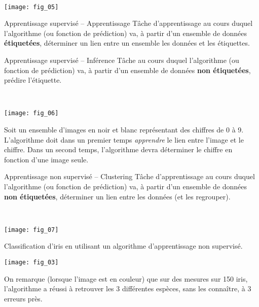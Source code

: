 \begin{exemple}~\\

\begin{center}
\texttt{[image: fig\_05]}
\end{center}
\end{exemple}


\begin{defi}{Apprentissage supervisé -- Apprentissage}
Tâche d'apprentissage au cours duquel l'algorithme (ou fonction de prédiction) va, à partir d'un ensemble de données \textbf{étiquetées}, déterminer un lien entre un ensemble les données et les étiquettes. 
\end{defi}

\begin{defi}{Apprentissage supervisé -- Inférence}
Tâche au cours duquel l'algorithme (ou fonction de prédiction) va, à partir d'un ensemble de données \textbf{non étiquetées}, prédire l'étiquette.

\end{defi}



\begin{exemple}~\\

\begin{center}
\texttt{[image: fig\_06]}
\end{center}
\end{exemple}


\begin{exemple}
Soit un ensemble d'images en noir et blanc représentant des chiffres de 0 à 9. L'algorithme doit dans un premier temps \textit{apprendre} le lien entre l'image et le chiffre. 
Dans un second temps, l'algorithme devra déterminer le chiffre en fonction d'une image seule.
\end{exemple}

\begin{defi}{Apprentissage non supervisé -- Clustering}
Tâche d'apprentissage au cours duquel l'algorithme (ou fonction de prédiction) va, à partir d'un ensemble de données \textbf{non étiquetées}, déterminer un lien entre les données (et les regrouper). 
\end{defi}



\begin{exemple} ~\\


\begin{center}
\texttt{[image: fig\_07]}
\end{center}


Classification d'iris en utilisant un algorithme d'apprentissage non supervisé.
\begin{center}
\texttt{[image: fig\_03]}
\end{center}

On remarque (lorsque l'image est en couleur) que sur des mesures sur 150 iris, l'algorithme a réussi à retrouver les 3 différentes espèces, sans les connaître, à 3 erreurs près.

\end{exemple}


